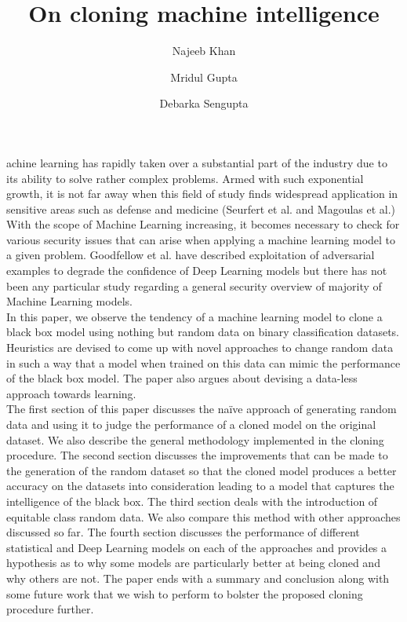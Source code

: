 \documentclass[9pt,twocolumn,twoside]{pnas-new}
\title{On cloning machine intelligence}
\author[a,c,1]{Najeeb Khan}
\author[b,1,2]{Mridul Gupta}
\author[a]{Debarka Sengupta}
\affil[a]{Affiliation One}
\affil[b]{Affiliation Two}
\affil[c]{Affiliation Three}
\begin{document}
\verticaladjustment{-2pt}

\maketitle
\thispagestyle{firststyle}

achine learning has rapidly taken over a substantial part of the industry due to its ability to solve rather complex problems. Armed with such exponential growth, it is not far away when this field of study finds widespread application in sensitive areas such as defense and medicine (Seurfert et al. and Magoulas et al.)\\
With the scope of Machine Learning increasing, it becomes necessary to check for various security issues that can arise when applying a machine learning model to a given problem. Goodfellow et al. have described exploitation of adversarial examples to degrade the confidence of Deep Learning models but there has not been any particular study regarding a general security overview of majority of Machine Learning models.\\
In this paper, we observe the tendency of a machine learning model to clone a black box model using nothing but random data on binary classification datasets. Heuristics are devised to come up with novel approaches to change random data in such a way that a model when trained on this data can mimic the performance of the black box model. The paper also argues about devising a data-less approach towards learning.\\
The first section of this paper discusses the naïve approach of generating random data and using it to judge the performance of a cloned model on the original dataset. We also describe the general methodology implemented in the cloning procedure. The second section discusses the improvements that can be made to the generation of the random dataset so that the cloned model produces a better accuracy on the datasets into consideration leading to a model that captures the intelligence of the black box. The third section deals with the introduction of equitable class random data. We also compare this method with other approaches discussed so far. The fourth section discusses the performance of different statistical and Deep Learning models on each of the approaches and provides a hypothesis as to why some models are particularly better at being cloned and why others are not. The paper ends with a summary and conclusion along with some future work that we wish to perform to bolster the proposed cloning procedure further. 
\end{document}
